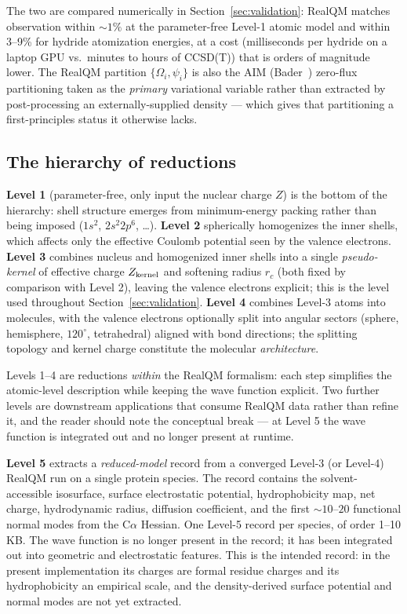 \documentclass[11pt]{article}
\begin{document}
The two are compared numerically in Section~\ref{sec:validation}: RealQM matches observation within ${\sim}1\%$ at the parameter-free Level-1 atomic model and within 3--9\% for hydride atomization energies, at a cost (milliseconds per hydride on a laptop GPU vs.\ minutes to hours of CCSD(T)) that is orders of magnitude lower. The RealQM partition $\{\Omega_i, \psi_i\}$ is also the AIM (Bader~\cite{Bader90}) zero-flux partitioning taken as the \emph{primary} variational variable rather than extracted by post-processing an externally-supplied density --- which gives that partitioning a first-principles status it otherwise lacks.

\subsection{The hierarchy of reductions}

\textbf{Level 1} (parameter-free, only input the nuclear charge $Z$) is the bottom of the hierarchy: shell structure emerges from minimum-energy packing rather than being imposed ($1s^2$, $2s^2 2p^6$, \ldots). \textbf{Level 2} spherically homogenizes the inner shells, which affects only the effective Coulomb potential seen by the valence electrons. \textbf{Level 3} combines nucleus and homogenized inner shells into a single \emph{pseudo-kernel} of effective charge $Z_{\rm kernel}$ and softening radius $r_c$ (both fixed by comparison with Level 2), leaving the valence electrons explicit; this is the level used throughout Section~\ref{sec:validation}. \textbf{Level 4} combines Level-3 atoms into molecules, with the valence electrons optionally split into angular sectors (sphere, hemisphere, $120^\circ$, tetrahedral) aligned with bond directions; the splitting topology and kernel charge constitute the molecular \emph{architecture}.

Levels 1--4 are reductions \emph{within} the RealQM formalism: each step simplifies the atomic-level description while keeping the wave function explicit. Two further levels are downstream applications that consume RealQM data rather than refine it, and the reader should note the conceptual break --- at Level 5 the wave function is integrated out and no longer present at runtime.

\textbf{Level 5} extracts a \emph{reduced-model} record from a converged Level-3 (or Level-4) RealQM run on a single protein species. The record contains the solvent-accessible isosurface, surface electrostatic potential, hydrophobicity map, net charge, hydrodynamic radius, diffusion coefficient, and the first $\sim 10$--$20$ functional normal modes from the C$\alpha$ Hessian. One Level-5 record per species, of order 1--10 KB. The wave function is no longer present in the record; it has been integrated out into geometric and electrostatic features. This is the intended record: in the present implementation its charges are formal residue charges and its hydrophobicity an empirical scale, and the density-derived surface potential and normal modes are not yet extracted.
\end{document}
